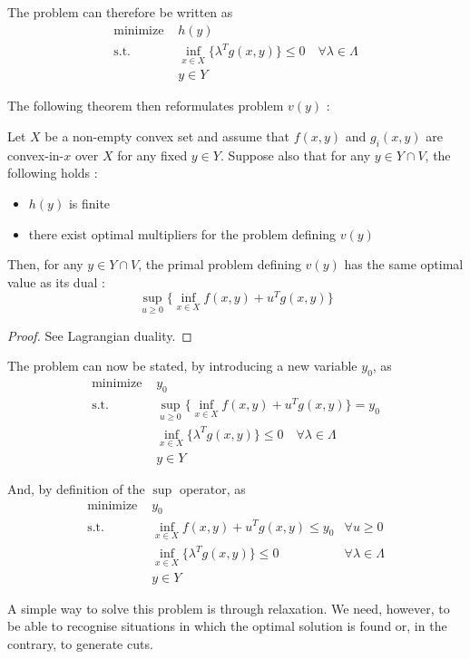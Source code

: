 The problem can therefore be written as 
\begin{align*}
    \textrm{minimize } & h(y) \\
    \textrm{s.t. } & \inf_{x\in X}\{ \lambda^Tg(x, y) \} \le 0\quad \forall \lambda\in\Lambda\\
    & y\in Y
\end{align*}

The following theorem then reformulates problem $v(y)$ :

\begin{theorem}[$v(y)$-representation]
    Let $X$ be a non-empty convex set and assume that $f(x,y)$ and $g_i(x,y)$ are convex-in-$x$ over $X$ for any fixed $y\in Y$. Suppose also that for any $y\in Y\cap V$, the following holds :
    \begin{itemize}
        \item $h(y)$ is finite
        \item there exist optimal multipliers for the problem defining $v(y)$
    \end{itemize}
    Then, for any $y\in Y\cap V$, the primal problem defining $v(y)$ has the same optimal value as its dual :
    \[ \sup_{u\ge 0}\{ \inf_{x\in X} f(x, y) + u^Tg(x,y) \} \]
\end{theorem}
\begin{proof}
    See Lagrangian duality.
\end{proof}

The problem can now be stated, by introducing a new variable $y_0$, as
\begin{align*}
    \textrm{minimize } & y_0\\
    \textrm{s.t. } & \sup_{u\ge 0}\{ \inf_{x\in X} f(x, y) + u^Tg(x,y) \} = y_0\\
    & \inf_{x\in X}\{ \lambda^Tg(x, y) \} \le 0\quad \forall \lambda\in\Lambda\\
    & y\in Y
\end{align*}

And, by definition of the $\sup$ operator, as
\begin{align*}
    \textrm{minimize } & y_0\\
    \textrm{s.t. } & \inf_{x\in X} f(x, y) + u^Tg(x,y) \le y_0 & \forall u\ge 0\\
    & \inf_{x\in X}\{ \lambda^Tg(x, y) \} \le 0 & \forall \lambda\in\Lambda\\
    & y\in Y
\end{align*}

A simple way to solve this problem is through relaxation. We need, however, to be able to recognise situations in which the optimal solution is found or, in the contrary, to generate cuts. 


